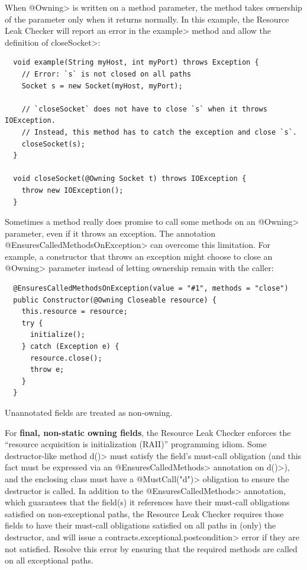 
When \<@Owning> is written on a method parameter, the method takes ownership of the
parameter only when it returns normally.  In this example, the Resource Leak Checker will report
an error in the \<example> method and allow the definition of \<closeSocket>:

\begin{verbatim}
  void example(String myHost, int myPort) throws Exception {
    // Error: `s` is not closed on all paths
    Socket s = new Socket(myHost, myPort);

    // `closeSocket` does not have to close `s` when it throws IOException.
    // Instead, this method has to catch the exception and close `s`.
    closeSocket(s);
  }

  void closeSocket(@Owning Socket t) throws IOException {
    throw new IOException();
  }
\end{verbatim}

Sometimes a method really does promise to call some methods on an \<@Owning> parameter,
even if it throws an exception.  The annotation \<@EnsuresCalledMethodsOnException> can
overcome this limitation.  For example, a constructor that throws an exception might
choose to close an \<@Owning> parameter instead of letting ownership remain with the caller:

\begin{verbatim}
  @EnsuresCalledMethodsOnException(value = "#1", methods = "close")
  public Constructor(@Owning Closeable resource) {
    this.resource = resource;
    try {
      initialize();
    } catch (Exception e) {
      resource.close();
      throw e;
    }
  }
\end{verbatim}


Unannotated fields are treated as non-owning.

For \textbf{final, non-static owning fields},
the Resource Leak Checker enforces the ``resource acquisition is
initialization (RAII)'' programming idiom.  Some
destructor-like method \<d()> must satisfy the field's must-call obligation
(and this fact must be expressed via an \<@EnsuresCalledMethods> annotation on \<d()>),
and the enclosing class must have a \<@MustCall("d")> obligation to
ensure the destructor is called. In addition to the \<@EnsuresCalledMethods> annotation,
which guarantees that the field(s) it references have their must-call obligations satisfied
on non-exceptional paths, the Resource Leak Checker requires those fields to have their must-call
obligations satisfied on all paths in (only) the destructor, and will issue a \<contracts.exceptional.postcondition>
error if they are not satisfied. Resolve this error by ensuring that the required methods are called
on all exceptional paths.

